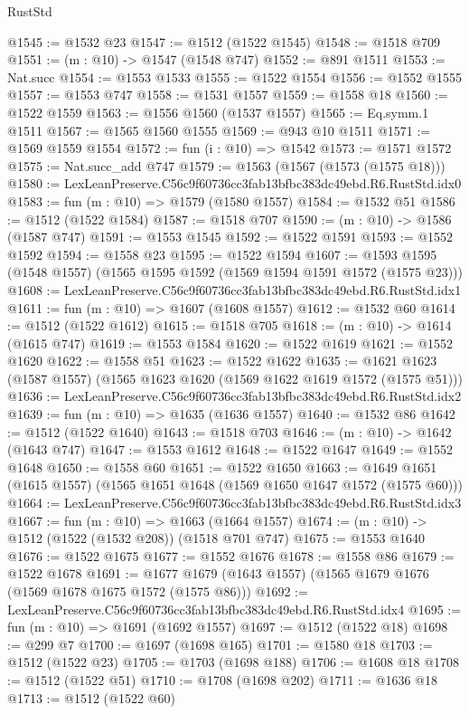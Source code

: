 \begin{lexlean}{RustStd}
\begin{coremodule}
@1545 := @1532 @23
@1547 := @1512 (@1522 @1545)
@1548 := @1518 @709
@1551 := (m : @10) -> @1547 (@1548 @747)
@1552 := @891 @1511
@1553 := Nat.succ
@1554 := @1553 @1533
@1555 := @1522 @1554
@1556 := @1552 @1555
@1557 := @1553 @747
@1558 := @1531 @1557
@1559 := @1558 @18
@1560 := @1522 @1559
@1563 := @1556 @1560 (@1537 @1557)
@1565 := Eq.symm.{1} @1511
@1567 := @1565 @1560 @1555
@1569 := @943 @10 @1511
@1571 := @1569 @1559 @1554
@1572 := fun (i : @10) => @1542
@1573 := @1571 @1572
@1575 := Nat.succ_add @747
@1579 := @1563 (@1567 (@1573 (@1575 @18)))
@1580 := LexLeanPreserve.C56c9f60736cc3fab13bfbc383dc49ebd.R6.RustStd.idx0
@1583 := fun (m : @10) => @1579 (@1580 @1557)
@1584 := @1532 @51
@1586 := @1512 (@1522 @1584)
@1587 := @1518 @707
@1590 := (m : @10) -> @1586 (@1587 @747)
@1591 := @1553 @1545
@1592 := @1522 @1591
@1593 := @1552 @1592
@1594 := @1558 @23
@1595 := @1522 @1594
@1607 := @1593 @1595 (@1548 @1557) (@1565 @1595 @1592 (@1569 @1594 @1591 @1572 (@1575 @23)))
@1608 := LexLeanPreserve.C56c9f60736cc3fab13bfbc383dc49ebd.R6.RustStd.idx1
@1611 := fun (m : @10) => @1607 (@1608 @1557)
@1612 := @1532 @60
@1614 := @1512 (@1522 @1612)
@1615 := @1518 @705
@1618 := (m : @10) -> @1614 (@1615 @747)
@1619 := @1553 @1584
@1620 := @1522 @1619
@1621 := @1552 @1620
@1622 := @1558 @51
@1623 := @1522 @1622
@1635 := @1621 @1623 (@1587 @1557) (@1565 @1623 @1620 (@1569 @1622 @1619 @1572 (@1575 @51)))
@1636 := LexLeanPreserve.C56c9f60736cc3fab13bfbc383dc49ebd.R6.RustStd.idx2
@1639 := fun (m : @10) => @1635 (@1636 @1557)
@1640 := @1532 @86
@1642 := @1512 (@1522 @1640)
@1643 := @1518 @703
@1646 := (m : @10) -> @1642 (@1643 @747)
@1647 := @1553 @1612
@1648 := @1522 @1647
@1649 := @1552 @1648
@1650 := @1558 @60
@1651 := @1522 @1650
@1663 := @1649 @1651 (@1615 @1557) (@1565 @1651 @1648 (@1569 @1650 @1647 @1572 (@1575 @60)))
@1664 := LexLeanPreserve.C56c9f60736cc3fab13bfbc383dc49ebd.R6.RustStd.idx3
@1667 := fun (m : @10) => @1663 (@1664 @1557)
@1674 := (m : @10) -> @1512 (@1522 (@1532 @208)) (@1518 @701 @747)
@1675 := @1553 @1640
@1676 := @1522 @1675
@1677 := @1552 @1676
@1678 := @1558 @86
@1679 := @1522 @1678
@1691 := @1677 @1679 (@1643 @1557) (@1565 @1679 @1676 (@1569 @1678 @1675 @1572 (@1575 @86)))
@1692 := LexLeanPreserve.C56c9f60736cc3fab13bfbc383dc49ebd.R6.RustStd.idx4
@1695 := fun (m : @10) => @1691 (@1692 @1557)
@1697 := @1512 (@1522 @18)
@1698 := @299 @7
@1700 := @1697 (@1698 @165)
@1701 := @1580 @18
@1703 := @1512 (@1522 @23)
@1705 := @1703 (@1698 @188)
@1706 := @1608 @18
@1708 := @1512 (@1522 @51)
@1710 := @1708 (@1698 @202)
@1711 := @1636 @18
@1713 := @1512 (@1522 @60)

\end{coremodule}
\end{lexlean}
